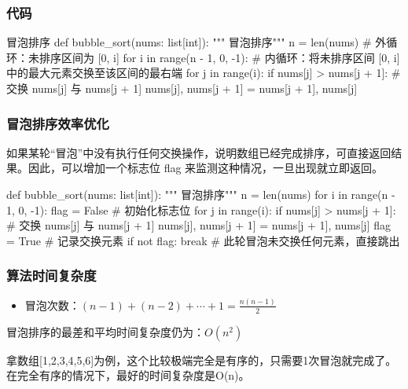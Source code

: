 \begin{frame}
\begin{center}
    \end{center}
\end{frame}


\begin{frame}[fragile]
    \frametitle{代码}
    \begin{codeblock}{冒泡排序}
def bubble_sort(nums: list[int]):
    """ 冒泡排序"""
    n = len(nums)
    # 外循环：未排序区间为 [0, i]
    for i in range(n - 1, 0, -1):
        # 内循环：将未排序区间 [0, i] 中的最大元素交换至该区间的最右端
        for j in range(i):
            if nums[j] > nums[j + 1]:
                # 交换 nums[j] 与 nums[j + 1]
                nums[j], nums[j + 1] = nums[j + 1], nums[j]
    \end{codeblock}
\end{frame}


\begin{frame}[fragile]
    \frametitle{冒泡排序效率优化}
    如果某轮“冒泡”中没有执行任何交换操作，说明数组已经完成排序，可直接返回结果。因此，可以增加一个标志位 flag 来监测这种情况，一旦出现就立即返回。
    \begin{codeblock}{}
def bubble_sort(nums: list[int]):
    """ 冒泡排序"""
    n = len(nums)
    for i in range(n - 1, 0, -1):
        flag = False  # 初始化标志位
        for j in range(i):
            if nums[j] > nums[j + 1]:
                # 交换 nums[j] 与 nums[j + 1]
                nums[j], nums[j + 1] = nums[j + 1], nums[j]    
                flag = True # 记录交换元素
        if not flag:
            break # 此轮冒泡未交换任何元素，直接跳出
    \end{codeblock}
\end{frame}


\begin{frame}
    \frametitle{算法时间复杂度}
    \begin{itemize}
        \item 冒泡次数：$(n-1)+(n-2)+\cdots + 1 = \frac{n(n-1)}{2}$
      \end{itemize}
      冒泡排序的最差和平均时间复杂度仍为：$O(n^2)$
      \begin{blankblock}{}
        拿数组[1,2,3,4,5,6]为例，这个比较极端完全是有序的，只需要1次冒泡就完成了。在完全有序的情况下，最好的时间复杂度是O(n)。
      \end{blankblock}
\end{frame}


